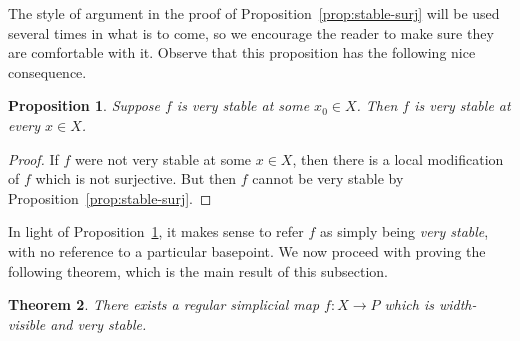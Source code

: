 \documentclass[11pt,a4paper]{amsart}
\newtheorem{theorem}{Theorem}[section]%
\newtheorem{proposition}[theorem]{Proposition}
\theoremstyle{definition}
\begin{document}
The style of argument in the proof of Proposition~\ref{prop:stable-surj} will be used several times in what is to come, so we encourage the reader to make sure they are comfortable with it.
Observe that this proposition has the following nice consequence.

\begin{proposition}\label{prop:verystableeverywhere}
    Suppose $f$ is very stable at some $x_0 \in X$. Then $f$ is very stable at every $x \in X$.
\end{proposition}
    

\begin{proof}
    If $f$ were not very stable at some $x \in X$, then there is a local modification of $f$ which is not surjective. But then $f$ cannot be very stable by Proposition~\ref{prop:stable-surj}.
\end{proof}

In light of Proposition~\ref{prop:verystableeverywhere}, it makes sense to refer $f$ as simply being \emph{very stable}, with no reference to a particular basepoint.
We now proceed with proving the following theorem, which is the main result of this subsection.


\begin{theorem}\label{thm:stable-map-exists}
    There exists a regular simplicial map $f : X \to P$ which is width-visible and very stable.
\end{theorem}
\end{document}
